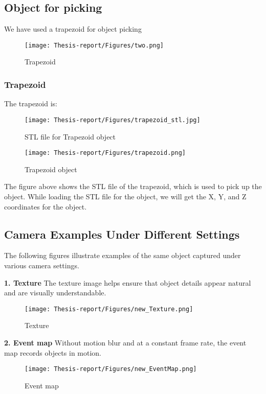 \documentclass[12pt]{article}
\begin{document}
\newpage
\subsection{Object for picking}
We have used a trapezoid for object picking 

\begin{figure}[h]
    \centering
    \texttt{[image: Thesis-report/Figures/two.png]} 
    \caption{Trapezoid}
    \label{fig1:two}
\end{figure}

\subsubsection{Trapezoid}
The trapezoid  is:\\
\begin{figure}
\centering
\begin{minipage}{0.58\textwidth} %
    \centering
    \texttt{[image: Thesis-report/Figures/trapezoid\_stl.jpg]} 
    \caption{STL file for Trapezoid object}
    \label{fig:trapezoid_stl}
\end{minipage}
\hfill
\begin{minipage}{0.28\textwidth} %
    \centering
    \texttt{[image: Thesis-report/Figures/trapezoid.png]} \caption{Trapezoid object}
    \label{fig:trapezoid}
\end{minipage}
\end{figure}
The figure above shows the STL file of the trapezoid, which is used to pick up the object. While loading the STL file for the object, we will get the X, Y, and Z coordinates for the object.

\subsection{Camera Examples Under Different Settings}

The following figures illustrate examples of the same object captured under various camera settings.

\noindent\textbf{1. Texture} The texture image helps ensure that object details appear natural and are visually understandable.
\begin{figure}[H]
    \centering
    \texttt{[image: Thesis-report/Figures/new\_Texture.png]}
    \caption{Texture}
    \label{fig:texture}
\end{figure}

\noindent\textbf{2. Event map} Without motion blur and at a constant frame rate, the event map records objects in motion.
\begin{figure}[H]
    \centering
    \texttt{[image: Thesis-report/Figures/new\_EventMap.png]}
    \caption{Event map}
    \label{fig:eventmap}
\end{figure}
\end{document}
